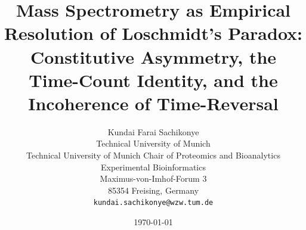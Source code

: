 \documentclass[twocolumn,10pt,a4paper]{article}
\theoremstyle{definition}
\theoremstyle{remark}
\begin{document}
\title{\textbf{Mass Spectrometry as Empirical Resolution of Loschmidt's Paradox: \\
Constitutive Asymmetry, the Time-Count Identity, and the Incoherence of Time-Reversal}}

\author{
Kundai Farai Sachikonye\\
Technical University of Munich\\
Technical University of Munich Chair of Proteomics and Bioanalytics \\
Experimental Bioinformatics \\
Maximus-von-Imhof-Forum 3\\
85354 Freising, Germany\\
\texttt{kundai.sachikonye@wzw.tum.de}
}

\date{\today}

\maketitle
\end{document}
